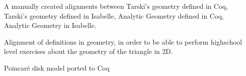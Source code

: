 \begin{workpackage}
\begin{wpdelivs}
  \begin{wpdeliv}[due=3,miles=startup,id=aligninggeometries,dissem=PU,nature=DEM,lead=Bel]
    {A manually created alignments between Tarski's geometry defined
      in Coq, Tarski's geometry defined in Isabelle, Analytic Geometry
      defined in Coq, Analytic Geometry in Isabelle.}
  \end{wpdeliv}
  \begin{wpdeliv}[due=3,miles=startup,id=aligninggeometrieshighschool,dissem=PU,nature=DEM,lead=Str]
    {Alignment of definitions in geometry, in order to be able to
      perform highschool level exercises about the geometry of the
      triangle in 2D.}
  \end{wpdeliv}
  \begin{wpdeliv}[due=3,miles=startup,id=aligningpoincare,dissem=PU,nature=DEM,lead=Bel]
    {Poincar\'e disk model ported to Coq}
  \end{wpdeliv}
\end{wpdelivs}
\end{workpackage}

